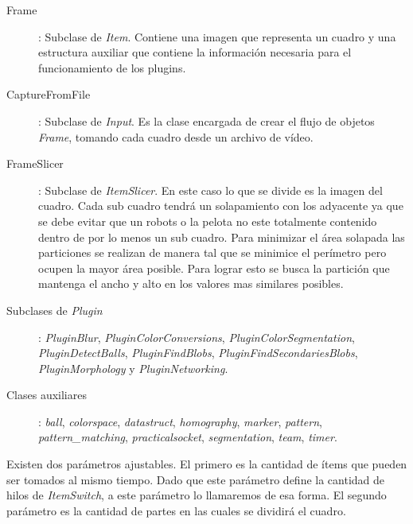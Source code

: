 \begin{description}

\item[Frame]: Subclase de \emph{Item}. Contiene una imagen que representa un
	cuadro y una estructura auxiliar que contiene la información necesaria
	para el funcionamiento de los plugins.

\item[CaptureFromFile]: Subclase de \emph{Input}. Es la clase encargada de crear
	el flujo de objetos \emph{Frame}, tomando cada cuadro desde un archivo
	de vídeo.

\item[FrameSlicer]: Subclase de \emph{ItemSlicer}. En este caso lo que se divide
	es la imagen del cuadro. Cada sub cuadro tendrá un solapamiento con los
	adyacente ya que se debe evitar que un robots o la pelota no este
	totalmente contenido dentro de por lo menos un sub cuadro. Para
	minimizar el área solapada las particiones se realizan de manera tal que
	se minimice el perímetro pero ocupen la mayor área posible. Para lograr
	esto se busca la partición que mantenga el ancho y alto en los valores
	mas similares posibles.

\item[Subclases de \emph{Plugin}]: \emph{PluginBlur},
	\emph{PluginColorConversions}, \emph{PluginColorSegmentation},
	\emph{PluginDetectBalls}, \emph{PluginFindBlobs},
	\emph{PluginFindSecondariesBlobs}, \emph{PluginMorphology} y
	\emph{PluginNetworking}.

\item[Clases auxiliares]: \emph{ball}, \emph{colorspace}, \emph{datastruct},
	\emph{homography}, \emph{marker}, \emph{pattern},
	\emph{pattern\_matching}, \emph{practicalsocket}, \emph{segmentation},
	\emph{team}, \emph{timer}.

\end{description}

Existen dos parámetros ajustables. El primero es la cantidad de ítems que pueden
ser tomados al mismo tiempo. Dado que este parámetro define la cantidad de hilos
de \emph{ItemSwitch}, a este parámetro lo llamaremos de esa forma. El segundo
parámetro es la cantidad de partes en las cuales se dividirá el cuadro.
